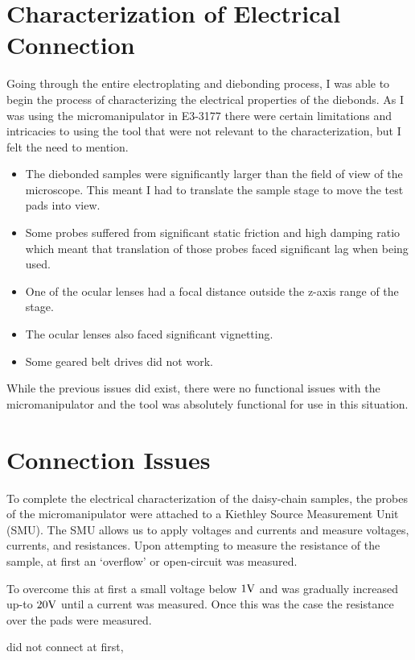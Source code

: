 \section{Characterization of Electrical Connection}

Going through the entire electroplating and diebonding process, I was able to begin the process of characterizing the electrical properties of the diebonds. As I was using the micromanipulator in E3-3177 there were certain limitations and intricacies to using the tool that were not relevant to the characterization, but I felt the need to mention.

\begin{itemize}
    \item The diebonded samples were significantly larger than the field of view of the microscope. This meant I had to translate the sample stage to move the test pads into view.
    \item Some probes suffered from significant static friction and high damping ratio which meant that translation of those probes faced significant lag when being used.
    \item One of the ocular lenses had a focal distance outside the z-axis range of the stage.
    \item The ocular lenses also faced significant vignetting.
    \item Some geared belt drives did not work.
\end{itemize}

While the previous issues did exist, there were no functional issues with the micromanipulator and the tool was absolutely functional for use in this situation.

\section{Connection Issues}
To complete the electrical characterization of the daisy-chain samples, the probes of the micromanipulator were attached to a Kiethley Source Measurement Unit (SMU). The SMU allows us to apply voltages and currents and measure voltages, currents, and resistances. Upon attempting to measure the resistance of the sample, at first an `overflow' or open-circuit was measured.

To overcome this at first a small voltage below $1 \V$ and was gradually increased up-to $20 \V$ until a current was measured. Once this was the case the resistance over the pads were measured.


did not connect at first,

